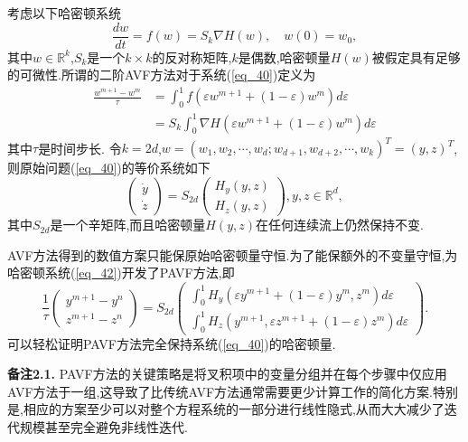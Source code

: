 考虑以下哈密顿系统
\begin{equation}
\frac{d w}{d t}=f(w)=S_{k} \nabla H(w), \quad w(0)=w_{0},
\label{eq_40}\end{equation}
其中$w \in \mathbb{R}^{k}$,$S_{k}$是一个$k \times k$的反对称矩阵,$k$是偶数,哈密顿量$H(w)$被假定具有足够的可微性.所谓的二阶AVF方法对于系统(\ref{eq_40})定义为
\begin{equation}
\begin{aligned}
\frac{w^{m+1}-w^{m}}{\tau} &=\int_{0}^{1} f\left(\varepsilon w^{m+1}+(1-\varepsilon) w^{m}\right) d \varepsilon \\
&=S_{k} \int_{0}^{1} \nabla H\left(\varepsilon w^{m+1}+(1-\varepsilon) w^{m}\right) d \varepsilon
\end{aligned}
\label{eq_41}\end{equation}
其中$\tau$是时间步长.
令$k=2d$,$w=\left(w_{1}, w_{2}, \cdots, w_{d} ; w_{d+1}, w_{d+2}, \cdots, w_{k}\right)^{T}=(y, z)^{T}$,则原始问题(\ref{eq_40})的等价系统如下
\begin{equation}
\left(\begin{array}{l}
\dot{y} \\
\dot{z}
\end{array}\right)=S_{2 d}\left(\begin{array}{c}
H_{y}(y, z) \\
H_{z}(y, z)
\end{array}\right), y, z \in \mathbb{R}^{d},
\label{eq_42}\end{equation}
其中$S_{2 d}$是一个辛矩阵,而且哈密顿量$H(y, z)$在任何连续流上仍然保持不变.

AVF方法得到的数值方案只能保原始哈密顿量守恒.为了能保额外的不变量守恒,为哈密顿系统(\ref{eq_42})开发了PAVF方法,即
\begin{equation}
\frac{1}{\tau}\left(\begin{array}{c}
y^{m+1}-y^{n} \\
z^{m+1}-z^{n}
\end{array}\right)=S_{2 d}\left(\begin{array}{c}
\int_{0}^{1} H_{y}\left(\varepsilon y^{m+1}+(1-\varepsilon) y^{m}, z^{m}\right) d \varepsilon \\
\int_{0}^{1} H_{z}\left(y^{m+1}, \varepsilon z^{m+1}+(1-\varepsilon) z^{m}\right) d \varepsilon
\end{array}\right) .
\label{eq_43}\end{equation}
可以轻松证明PAVF方法完全保持系统(\ref{eq_40})的哈密顿量.

\textbf{备注2.1.} PAVF方法的关键策略是将叉积项中的变量分组并在每个步骤中仅应用AVF方法于一组,这导致了比传统AVF方法通常需要更少计算工作的简化方案.特别是,相应的方案至少可以对整个方程系统的一部分进行线性隐式,从而大大减少了迭代规模甚至完全避免非线性迭代.

